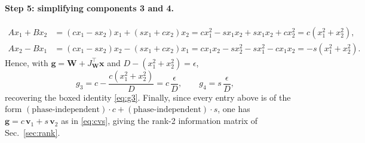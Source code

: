 \documentclass[11pt]{article}
\newcommand{\vx}{\mathbf{x}}
\newcommand{\vW}{\mathbf{W}}
\newcommand{\vg}{\mathbf{g}}
\newcommand{\vv}{\mathbf{v}}
\begin{document}
\paragraph{Step 5: simplifying components 3 and 4.}
\begin{align}
  Ax_1+Bx_2 &= (cx_1-sx_2)x_1+(sx_1+cx_2)x_2
             = cx_1^2-sx_1x_2+sx_1x_2+cx_2^2 = c(x_1^2+x_2^2),\\
  Ax_2-Bx_1 &= (cx_1-sx_2)x_2-(sx_1+cx_2)x_1
             = cx_1x_2-sx_2^2-sx_1^2-cx_1x_2 = -s(x_1^2+x_2^2).
\end{align}
Hence, with $\vg=\vW+J_{\!\vW}^{\top}\vx$ and $D-(x_1^2+x_2^2)=\epsilon$,
\begin{equation}
  g_3 = c-\frac{c(x_1^2+x_2^2)}{D}=c\,\frac{\epsilon}{D},
  \qquad
  g_4 = s\,\frac{\epsilon}{D},
\end{equation}
recovering the boxed identity \eqref{eq:g3}. Finally, since every entry
above is of the form $(\text{phase-independent})\cdot c+(\text{phase-independent})\cdot s$,
one has $\vg=c\,\vv_1+s\,\vv_2$ as in \eqref{eq:cvs}, giving the rank-2
information matrix of Sec.~\ref{sec:rank}.
\end{document}

